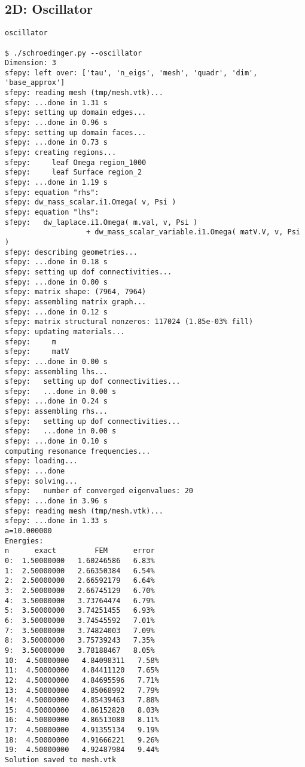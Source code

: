 \subsection{2D: Oscillator}

\begin{lstlisting}
oscillator

$ ./schroedinger.py --oscillator
Dimension: 3
sfepy: left over: ['tau', 'n_eigs', 'mesh', 'quadr', 'dim', 'base_approx']
sfepy: reading mesh (tmp/mesh.vtk)...
sfepy: ...done in 1.31 s
sfepy: setting up domain edges...
sfepy: ...done in 0.96 s
sfepy: setting up domain faces...
sfepy: ...done in 0.73 s
sfepy: creating regions...
sfepy:     leaf Omega region_1000
sfepy:     leaf Surface region_2
sfepy: ...done in 1.19 s
sfepy: equation "rhs":
sfepy: dw_mass_scalar.i1.Omega( v, Psi )
sfepy: equation "lhs":
sfepy:   dw_laplace.i1.Omega( m.val, v, Psi )
                   + dw_mass_scalar_variable.i1.Omega( matV.V, v, Psi )
sfepy: describing geometries...
sfepy: ...done in 0.18 s
sfepy: setting up dof connectivities...
sfepy: ...done in 0.00 s
sfepy: matrix shape: (7964, 7964)
sfepy: assembling matrix graph...
sfepy: ...done in 0.12 s
sfepy: matrix structural nonzeros: 117024 (1.85e-03% fill)
sfepy: updating materials...
sfepy:     m
sfepy:     matV
sfepy: ...done in 0.00 s
sfepy: assembling lhs...
sfepy:   setting up dof connectivities...
sfepy:   ...done in 0.00 s
sfepy: ...done in 0.24 s
sfepy: assembling rhs...
sfepy:   setting up dof connectivities...
sfepy:   ...done in 0.00 s
sfepy: ...done in 0.10 s
computing resonance frequencies...
sfepy: loading...
sfepy: ...done
sfepy: solving...
sfepy:   number of converged eigenvalues: 20
sfepy: ...done in 3.96 s
sfepy: reading mesh (tmp/mesh.vtk)...
sfepy: ...done in 1.33 s
a=10.000000
Energies:
n      exact         FEM      error
0:  1.50000000   1.60246586   6.83%
1:  2.50000000   2.66350384   6.54%
2:  2.50000000   2.66592179   6.64%
3:  2.50000000   2.66745129   6.70%
4:  3.50000000   3.73764474   6.79%
5:  3.50000000   3.74251455   6.93%
6:  3.50000000   3.74545592   7.01%
7:  3.50000000   3.74824003   7.09%
8:  3.50000000   3.75739243   7.35%
9:  3.50000000   3.78188467   8.05%
10:  4.50000000   4.84098311   7.58%
11:  4.50000000   4.84411120   7.65%
12:  4.50000000   4.84695596   7.71%
13:  4.50000000   4.85068992   7.79%
14:  4.50000000   4.85439463   7.88%
15:  4.50000000   4.86152828   8.03%
16:  4.50000000   4.86513080   8.11%
17:  4.50000000   4.91355134   9.19%
18:  4.50000000   4.91666221   9.26%
19:  4.50000000   4.92487984   9.44%
Solution saved to mesh.vtk

\end{lstlisting}

